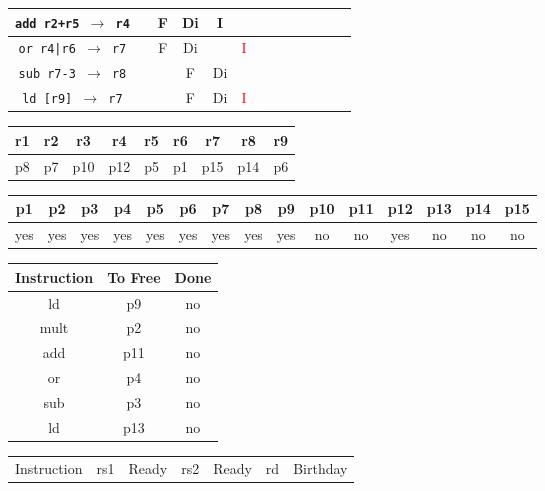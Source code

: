 \documentclass[12pt]{article}
\begin{document}
\begin{enumerate}
\begin{table}[H]
\begin{tabular}{|c|c|c|c|c|c|c|c|c|c|c|c|c|}
					\texttt{add r2+r5 $\rightarrow$ r4} &  & F & Di & I &  &  &  &  &  &  &  &\\
					\hline
					\texttt{or r4|r6 $\rightarrow$ r7} &  & F & Di &  & \textcolor{red}{I} &  &  &  &  &  &  &\\
					\hline
					\texttt{sub r7-3 $\rightarrow$ r8} &  &  & F & Di &  &  &  &  &  &  &  &\\
					\hline
					\texttt{ld [r9] $\rightarrow$ r7} &  &  & F & Di & \textcolor{red}{I} &  &  &  &  &  &  &\\
					\hline 
				\end{tabular}
			\end{table}
			\begin{table}[H]
				\begin{tabular}{|c|c|c|c|c|c|c|c|c|}
					\hline
					r1 & r2 & r3 & r4 & r5 & r6 & r7 & r8 & r9\\
					\hline
					p8 & p7 & p10 & p12 & p5 & p1 & p15 & p14 & p6\\
					\hline
				\end{tabular}
			\end{table}
			\begin{table}[H]
				\begin{tabular}{|c|c|c|c|c|c|c|c|c|c|c|c|c|c|c|}
					\hline
					p1 & p2 & p3 & p4 & p5 & p6 & p7 & p8 & p9 & p10 & p11 & p12 & p13 & p14 & p15\\
					\hline
					yes & yes & yes & yes & yes & yes & yes & yes & yes & no & no & yes & no & no & no\\
					\hline
				\end{tabular}
			\end{table}
			\begin{table}[H]
				\begin{tabular}{|c|c|c|}
					\hline
					Instruction & To Free & Done\\
					\hline
					ld & p9 & no\\
					\hline
					mult & p2 & no\\
					\hline
					add & p11 & no\\
					\hline
					or & p4 & no\\
					\hline
					sub & p3 & no\\
					\hline
					ld & p13 & no\\
					\hline
				\end{tabular}
				\hfill
				\begin{tabular}{|c|c|c|c|c|c|c|}
					\hline
					Instruction & rs1 & Ready & rs2 & Ready & rd & Birthday\\

\end{tabular}
\end{table}
\end{enumerate}
\end{document}
